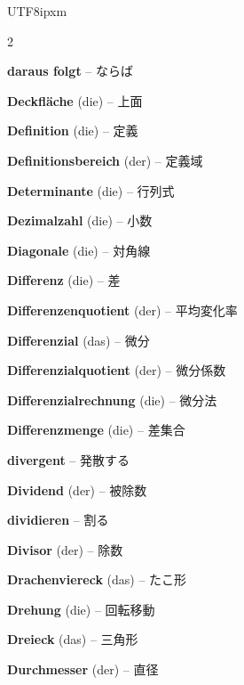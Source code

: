 \begin{CJK}{UTF8}{ipxm}
\begin{multicols}{2}
\par\nopagebreak
\textbf{daraus folgt} -- ならば\dotfill\hyperref[e:350]{\pageref*{e:350}}\par
\textbf{Deckfläche} (die) -- 上面\dotfill\hyperref[e:249]{\pageref*{e:249}}\par
\textbf{Definition} (die) -- 定義\dotfill\hyperref[e:346]{\pageref*{e:346}}\par
\textbf{Definitionsbereich} (der) -- 定義域\dotfill\hyperref[e:109]{\pageref*{e:109}}\par
\textbf{Determinante} (die) -- 行列式\dotfill\hyperref[e:325]{\pageref*{e:325}}\par
\textbf{Dezimalzahl} (die) -- 小数\dotfill\hyperref[e:13]{\pageref*{e:13}}\par
\textbf{Diagonale} (die) -- 対角線\dotfill\hyperref[e:197]{\pageref*{e:197}}\par
\textbf{Differenz} (die) -- 差\dotfill\hyperref[e:18]{\pageref*{e:18}}\par
\textbf{Differenzenquotient} (der) -- 平均変化率\dotfill\hyperref[e:272]{\pageref*{e:272}}\par
\textbf{Differenzial} (das) -- 微分\dotfill\hyperref[e:276]{\pageref*{e:276}}\par
\textbf{Differenzialquotient} (der) -- 微分係数\dotfill\hyperref[e:275]{\pageref*{e:275}}\par
\textbf{Differenzialrechnung} (die) -- 微分法\dotfill\hyperref[e:274]{\pageref*{e:274}}\par
\textbf{Differenzmenge} (die) -- 差集合\dotfill\hyperref[e:102]{\pageref*{e:102}}\par
\textbf{divergent} -- 発散する\dotfill\hyperref[e:263]{\pageref*{e:263}}\par
\textbf{Dividend} (der) -- 被除数\dotfill\hyperref[e:26]{\pageref*{e:26}}\par
\textbf{dividieren} -- 割る\dotfill\hyperref[e:24]{\pageref*{e:24}}\par
\textbf{Divisor} (der) -- 除数\dotfill\hyperref[e:27]{\pageref*{e:27}}\par
\textbf{Drachenviereck} (das) -- たこ形\dotfill\hyperref[e:203]{\pageref*{e:203}}\par
\textbf{Drehung} (die) -- 回転移動\dotfill\hyperref[e:174]{\pageref*{e:174}}\par
\textbf{Dreieck} (das) -- 三角形\dotfill\hyperref[e:177]{\pageref*{e:177}}\par
\textbf{Durchmesser} (der) -- 直径\dotfill\hyperref[e:214]{\pageref*{e:214}}\par


\end{multicols}
\end{CJK}
